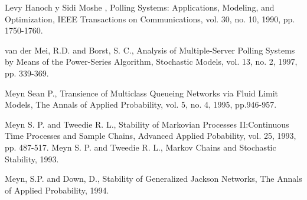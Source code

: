 \begin{thebibliography}{99}
Levy Hanoch y Sidi Moshe , Polling Systems: Applications, Modeling, and Optimization, IEEE Transactions on Communications, vol. 30, no. 10, 1990, pp. 1750-1760.


 van der Mei, R.D. and Borst, S. C., Analysis of Multiple-Server Polling
Systems by Means of the Power-Series Algorithm, Stochastic Models,
vol. 13, no. 2, 1997, pp. 339-369.


 Meyn Sean P., Transience of Multiclass Queueing Networks via Fluid
Limit Models, The Annals of Applied Probability, vol. 5, no. 4,
1995, pp.946-957.

 Meyn S. P. and Tweedie R. L., Stability of Markovian Processes
 II:Continuous Time Processes and Sample Chains, Advanced Applied Pobability, vol. 25, 1993, pp. 487-517.
 Meyn S. P. and Tweedie R. L., Markov Chains and Stochastic Stability,
1993.

 Meyn, S.P. and Down, D., Stability of Generalized Jackson
Networks, The Annals of Applied Probability, 1994.




\end{thebibliography}
